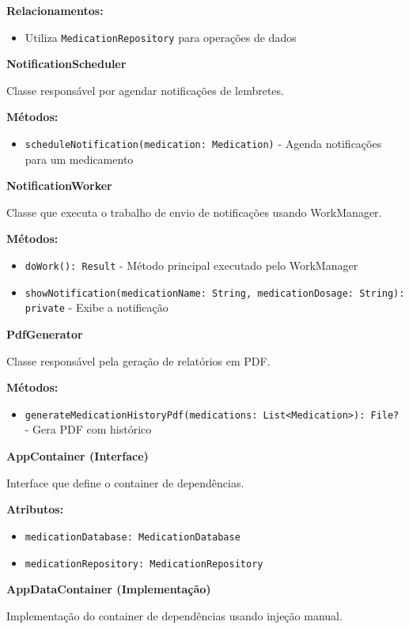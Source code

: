 \documentclass[12pt]{article}
\begin{document}
\textbf{Relacionamentos:}
\begin{itemize}
    \item Utiliza \texttt{MedicationRepository} para operações de dados
\end{itemize}

\textbf{NotificationScheduler}

Classe responsável por agendar notificações de lembretes.

\textbf{Métodos:}
\begin{itemize}
    \item \texttt{scheduleNotification(medication: Medication)} - Agenda notificações para um medicamento
\end{itemize}

\textbf{NotificationWorker}

Classe que executa o trabalho de envio de notificações usando WorkManager.

\textbf{Métodos:}
\begin{itemize}
    \item \texttt{doWork(): Result} - Método principal executado pelo WorkManager
    \item \texttt{showNotification(medicationName: String, medicationDosage: String): private} - Exibe a notificação
\end{itemize}

\textbf{PdfGenerator}

Classe responsável pela geração de relatórios em PDF.

\textbf{Métodos:}
\begin{itemize}
    \item \texttt{generateMedicationHistoryPdf(medications: List<Medication>): File?} - Gera PDF com histórico
\end{itemize}

\textbf{AppContainer (Interface)}

Interface que define o container de dependências.

\textbf{Atributos:}
\begin{itemize}
    \item \texttt{medicationDatabase: MedicationDatabase}
    \item \texttt{medicationRepository: MedicationRepository}
\end{itemize}

\textbf{AppDataContainer (Implementação)}

Implementação do container de dependências usando injeção manual.
\end{document}
